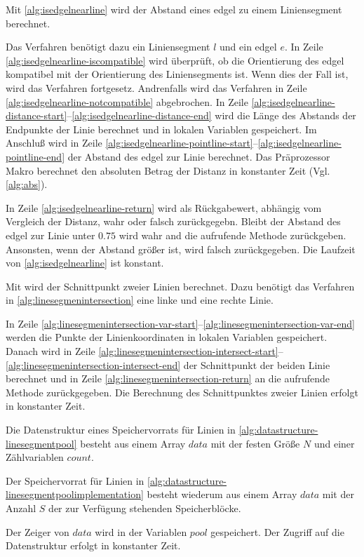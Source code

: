 Mit \autoref{alg:isedgelnearline} wird der Abstand eines \gls{edgel} zu einem Liniensegment berechnet.

Das Verfahren benötigt dazu ein Liniensegment $l$ und ein \gls{edgel} $e$. In Zeile
 \ref{alg:isedgelnearline-iscompatible} wird überprüft, ob die Orientierung des \gls{edgel} kompatibel mit der
 Orientierung des Liniensegments ist. Wenn dies der Fall ist, wird das Verfahren fortgesetz. Andrenfalls wird das
 Verfahren in Zeile \ref{alg:isedgelnearline-notcompatible} abgebrochen. In Zeile
 \ref{alg:isedgelnearline-distance-start}--\ref{alg:isedgelnearline-distance-end} wird die Länge des Abstands der
 Endpunkte der Linie berechnet und in lokalen Variablen gespeichert. Im Anschluß wird in Zeile
 \ref{alg:isedgelnearline-pointline-start}--\ref{alg:isedgelnearline-pointline-end} der Abstand des \gls{edgel} zur
 Linie berechnet. Das Präprozessor Makro  berechnet den absoluten Betrag der Distanz in konstanter Zeit
 (Vgl. \autoref{alg:abs}).

In Zeile \ref{alg:isedgelnearline-return} wird als Rückgabewert, abhängig vom Vergleich der Distanz, wahr oder falsch
 zurückgegebn. Bleibt der Abstand des \gls{edgel} zur Linie unter $0.75$ wird wahr and die aufrufende Methode
 zurückgeben. Ansonsten, wenn der Abstand größer ist, wird falsch zurückgegeben. Die Laufzeit von
 \autoref{alg:isedgelnearline} ist konstant.

Mit  wird der Schnittpunkt zweier Linien berechnet. Dazu benötigt das Verfahren in
 \autoref{alg:linesegmenintersection} eine linke und eine rechte Linie.

 In Zeile \ref{alg:linesegmenintersection-var-start}--\ref{alg:linesegmenintersection-var-end} werden die Punkte der
 Linienkoordinaten in lokalen Variablen gespeichert. Danach wird in Zeile
 \ref{alg:linesegmenintersection-intersect-start}--\ref{alg:linesegmenintersection-intersect-end} der Schnittpunkt der
 beiden Linie berechnet und in Zeile \ref{alg:linesegmenintersection-return} an die aufrufende Methode zurückgegeben.
 Die Berechnung des Schnittpunktes zweier Linien erfolgt in konstanter Zeit.

Die Datenstruktur eines Speichervorrats für Linien in \autoref{alg:datastructure-linesegmentpool} besteht aus einem
 Array $\mathit{data}$ mit der festen Größe $N$ und einer Zählvariablen $\mathit{count}$.

Der Speichervorrat für Linien in \autoref{alg:datastructure-linesegmentpoolimplementation} besteht wiederum aus einem
 Array $\mathit{data}$ mit der Anzahl $S$ der zur Verfügung stehenden Speicherblöcke.

Der Zeiger von $\mathit{data}$ wird in der Variablen $\mathit{pool}$ gespeichert. Der Zugriff auf die Datenstruktur
 erfolgt in konstanter Zeit.

